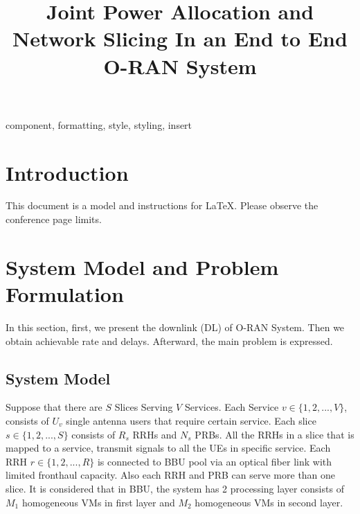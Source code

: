 \documentclass[conference]{IEEEtran}
\begin{document}
\title{Joint Power Allocation and Network Slicing In an End to End O-RAN System
}

\author{
\and
{}

}

\maketitle

\begin{abstract}

\end{abstract}

\begin{IEEEkeywords}
component, formatting, style, styling, insert
\end{IEEEkeywords}

\section{Introduction}
This document is a model and instructions for \LaTeX.
Please observe the conference page limits. 

\section{System Model and Problem Formulation}
In this section, first, we present the downlink (DL) of O-RAN System. Then we obtain achievable rate and delays.
Afterward, the main problem is expressed.
\subsection{System Model}
Suppose that there are $S$ Slices Serving $V$ Services. Each Service $v\in \{1,2,...,V \} $, consists of $U_v$ single antenna users that require certain service. Each slice $s \in \{1,2,...,S \}$ consists of $R_s$ RRHs and $N_s$ PRBs. All the RRHs in a slice that is mapped to a service, transmit signals to all the UEs in specific service. Each RRH $r \in \{1,2,...,R \}$ is connected to BBU pool via an optical fiber link with limited fronthaul capacity. Also each RRH and PRB can serve more than one slice. It is considered that in BBU, the system has 2 processing layer consists of $M_1$ homogeneous VMs in first layer and $M_2$ homogeneous VMs in second layer.
\end{document}
